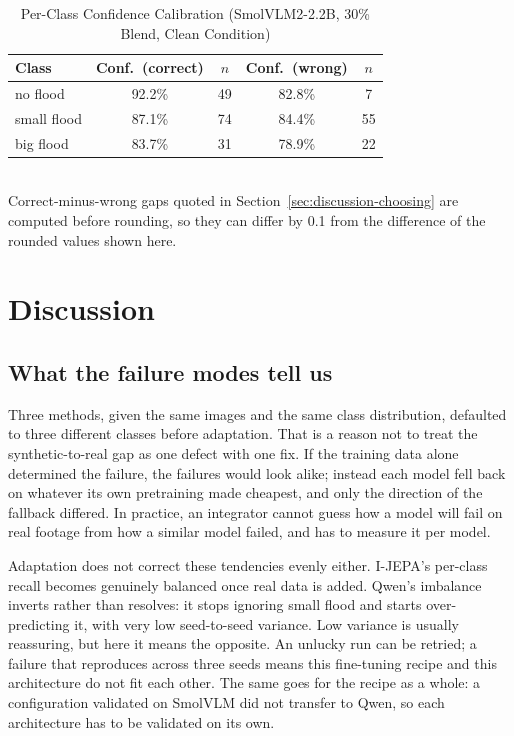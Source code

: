 \documentclass[conference]{IEEEtran}
\begin{document}
\begin{table}[t]
\caption{Per-Class Confidence Calibration (SmolVLM2-2.2B, 30\% Blend, Clean Condition)}
\label{tab:calibration}
\centering
\begin{tabular}{lcccc}
\toprule
\textbf{Class} & \textbf{Conf.\ (correct)} & \textbf{$n$} & \textbf{Conf.\ (wrong)} & \textbf{$n$} \\
\midrule
no flood & 92.2\% & 49 & 82.8\% & 7 \\
small flood & 87.1\% & 74 & 84.4\% & 55 \\
big flood & 83.7\% & 31 & 78.9\% & 22 \\
\bottomrule
\end{tabular}
\\[2pt]
{\footnotesize Correct-minus-wrong gaps quoted in Section~\ref{sec:discussion-choosing} are computed before rounding, so they can differ by 0.1 from the difference of the rounded values shown here.}
\end{table}

\section{Discussion}

\subsection{What the failure modes tell us}

Three methods, given the same images and the same class distribution, defaulted to three different classes before adaptation. That is a reason not to treat the synthetic-to-real gap as one defect with one fix. If the training data alone determined the failure, the failures would look alike; instead each model fell back on whatever its own pretraining made cheapest, and only the direction of the fallback differed. In practice, an integrator cannot guess how a model will fail on real footage from how a similar model failed, and has to measure it per model.

Adaptation does not correct these tendencies evenly either. I-JEPA's per-class recall becomes genuinely balanced once real data is added. Qwen's imbalance inverts rather than resolves: it stops ignoring small flood and starts over-predicting it, with very low seed-to-seed variance. Low variance is usually reassuring, but here it means the opposite. An unlucky run can be retried; a failure that reproduces across three seeds means this fine-tuning recipe and this architecture do not fit each other. The same goes for the recipe as a whole: a configuration validated on SmolVLM did not transfer to Qwen, so each architecture has to be validated on its own.
\end{document}

